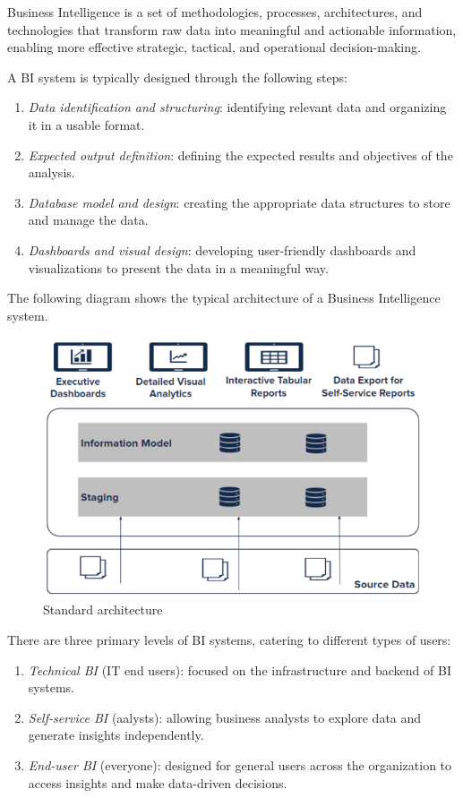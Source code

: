 \begin{definition}
    Business Intelligence is a set of methodologies, processes, architectures, and technologies that transform raw data into meaningful and actionable information, enabling more effective strategic, tactical, and operational decision-making.
\end{definition}
\noindent A BI system is typically designed through the following steps:
\begin{enumerate}
    \item \textit{Data identification and structuring}: identifying relevant data and organizing it in a usable format.
    \item \textit{Expected output definition}: defining the expected results and objectives of the analysis.
    \item \textit{Database model and design}: creating the appropriate data structures to store and manage the data.
    \item \textit{Dashboards and visual design}: developing user-friendly dashboards and visualizations to present the data in a meaningful way.
\end{enumerate}
\noindent The following diagram shows the typical architecture of a Business Intelligence system.
\begin{figure}[H]
    \centering
    \includegraphics[width=0.5\linewidth]{images/bis9.png}
    \caption{Standard architecture}
\end{figure}
There are three primary levels of BI systems, catering to different types of users:
\begin{enumerate}
    \item \textit{Technical BI} (IT end users): focused on the infrastructure and backend of BI systems.
    \item \textit{Self-service BI} (aalysts): allowing business analysts to explore data and generate insights independently.
    \item \textit{End-user BI} (everyone): designed for general users across the organization to access insights and make data-driven decisions.
\end{enumerate}

